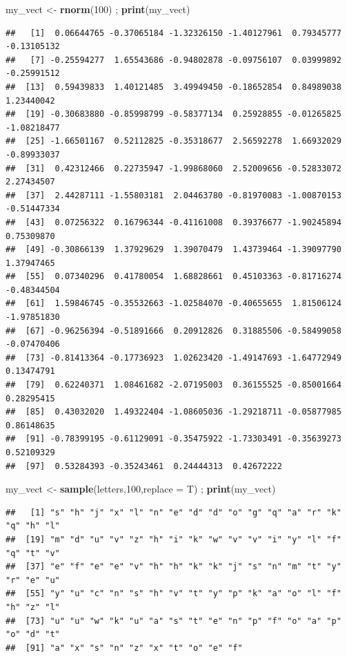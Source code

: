 \documentclass[
]{book}
\newenvironment{Shaded}{\begin{snugshade}}{\end{snugshade}}
\newcommand{\DataTypeTok}[1]{\textcolor[rgb]{0.13,0.29,0.53}{#1}}
\newcommand{\DecValTok}[1]{\textcolor[rgb]{0.00,0.00,0.81}{#1}}
\newcommand{\KeywordTok}[1]{\textcolor[rgb]{0.13,0.29,0.53}{\textbf{#1}}}
\newcommand{\NormalTok}[1]{#1}
\newcommand{\StringTok}[1]{\textcolor[rgb]{0.31,0.60,0.02}{#1}}
\begin{document}
\begin{Shaded}
\begin{Highlighting}[]
\NormalTok{my_vect <-}\StringTok{ }\KeywordTok{rnorm}\NormalTok{(}\DecValTok{100}\NormalTok{) ; }\KeywordTok{print}\NormalTok{(my_vect)}
\end{Highlighting}
\end{Shaded}

\begin{verbatim}
##   [1]  0.06644765 -0.37065184 -1.32326150 -1.40127961  0.79345777 -0.13105132
##   [7] -0.25594277  1.65543686 -0.94802878 -0.09756107  0.03999892 -0.25991512
##  [13]  0.59439833  1.40121485  3.49949450 -0.18652854  0.84989038  1.23440042
##  [19] -0.30683880 -0.85998799 -0.58377134  0.25928855 -0.01265825 -1.08218477
##  [25] -1.66501167  0.52112825 -0.35318677  2.56592278  1.66932029 -0.89933037
##  [31]  0.42312466  0.22735947 -1.99868060  2.52009656 -0.52833072  2.27434507
##  [37]  2.44287111 -1.55803181  2.04463780 -0.81970083 -1.00870153 -0.51447334
##  [43]  0.07256322  0.16796344 -0.41161008  0.39376677 -1.90245894  0.75309870
##  [49] -0.30866139  1.37929629  1.39070479  1.43739464 -1.39097790  1.37947465
##  [55]  0.07340296  0.41780054  1.68828661  0.45103363 -0.81716274 -0.48344504
##  [61]  1.59846745 -0.35532663 -1.02584070 -0.40655655  1.81506124 -1.97851830
##  [67] -0.96256394 -0.51891666  0.20912826  0.31885506 -0.58499058 -0.07470406
##  [73] -0.81413364 -0.17736923  1.02623420 -1.49147693 -1.64772949  0.13474791
##  [79]  0.62240371  1.08461682 -2.07195003  0.36155525 -0.85001664  0.28295415
##  [85]  0.43032020  1.49322404 -1.08605036 -1.29218711 -0.05877985  0.86148635
##  [91] -0.78399195 -0.61129091 -0.35475922 -1.73303491 -0.35639273  0.52109329
##  [97]  0.53284393 -0.35243461  0.24444313  0.42672222
\end{verbatim}

\begin{Shaded}
\begin{Highlighting}[]
\NormalTok{my_vect <-}\StringTok{ }\KeywordTok{sample}\NormalTok{(letters,}\DecValTok{100}\NormalTok{,}\DataTypeTok{replace =}\NormalTok{ T) ; }\KeywordTok{print}\NormalTok{(my_vect)}
\end{Highlighting}
\end{Shaded}

\begin{verbatim}
##   [1] "s" "h" "j" "x" "l" "n" "e" "d" "d" "o" "g" "q" "a" "r" "k" "q" "h" "l"
##  [19] "m" "d" "u" "v" "z" "h" "i" "k" "w" "v" "v" "i" "y" "l" "f" "q" "t" "v"
##  [37] "e" "f" "e" "e" "v" "h" "h" "k" "k" "j" "s" "n" "m" "t" "y" "r" "e" "u"
##  [55] "y" "u" "c" "n" "s" "h" "v" "t" "y" "p" "k" "a" "o" "l" "f" "h" "z" "l"
##  [73] "u" "u" "w" "k" "u" "a" "s" "t" "e" "n" "p" "f" "o" "a" "p" "o" "d" "t"
##  [91] "a" "x" "s" "n" "z" "x" "t" "o" "e" "f"
\end{verbatim}
\end{document}
